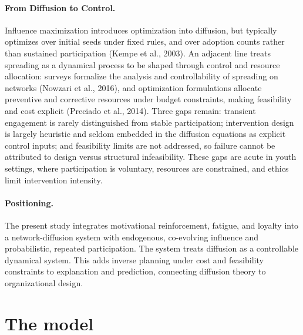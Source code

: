 \documentclass[11pt]{article}
\begin{document}
\paragraph{From Diffusion to Control.}
Influence maximization introduces optimization into diffusion, but typically optimizes over initial seeds under fixed rules, and over adoption counts rather than sustained participation (Kempe et al., 2003). An adjacent line treats spreading as a dynamical process to be shaped through control and resource allocation: surveys formalize the analysis and controllability of spreading on networks (Nowzari et al., 2016), and optimization formulations allocate preventive and corrective resources under budget constraints, making feasibility and cost explicit (Preciado et al., 2014). Three gaps remain: transient engagement is rarely distinguished from stable participation; intervention design is largely heuristic and seldom embedded in the diffusion equations as explicit control inputs; and feasibility limits are not addressed, so failure cannot be attributed to design versus structural infeasibility. These gaps are acute in youth settings, where participation is voluntary, resources are constrained, and ethics limit intervention intensity.

\paragraph{Positioning.}
The present study integrates motivational reinforcement, fatigue, and loyalty into a network-diffusion system with endogenous, co-evolving influence and probabilistic, repeated participation. The system treats diffusion as a controllable dynamical system. This adds inverse planning under cost and feasibility constraints to explanation and prediction, connecting diffusion theory to organizational design.


\section{The model}\label{sec:model}
\end{document}
